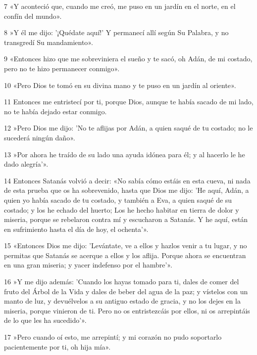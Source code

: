 \par 7 «Y aconteció que, cuando me creó, me puso en un jardín en el norte, en el confín del mundo».

\par 8 »Y él me dijo: '¡Quédate aquí!' Y permanecí allí según Su Palabra, y no transgredí Su mandamiento».

\par 9 «Entonces hizo que me sobreviniera el sueño y te sacó, oh Adán, de mi costado, pero no te hizo permanecer conmigo».

\par 10 «Pero Dios te tomó en su divina mano y te puso en un jardín al oriente».

\par 11 Entonces me entristecí por ti, porque Dios, aunque te había sacado de mi lado, no te había dejado estar conmigo.

\par 12 »Pero Dios me dijo: 'No te aflijas por Adán, a quien saqué de tu costado; no le sucederá ningún daño».

\par 13 »Por ahora he traído de su lado una ayuda idónea para él; y al hacerlo le he dado alegría'».

\par 14 Entonces Satanás volvió a decir: «No sabía cómo estáis en esta cueva, ni nada de esta prueba que os ha sobrevenido, hasta que Dios me dijo: 'He aquí, Adán, a quien yo había sacado de tu costado, y también a Eva, a quien saqué de su costado; y los he echado del huerto; Los he hecho habitar en tierra de dolor y miseria, porque se rebelaron contra mí y escucharon a Satanás. Y he aquí, están en sufrimiento hasta el día de hoy, el ochenta'».

\par 15 «Entonces Dios me dijo: 'Levántate, ve a ellos y hazlos venir a tu lugar, y no permitas que Satanás se acerque a ellos y los aflija. Porque ahora se encuentran en una gran miseria; y yacer indefenso por el hambre'».

\par 16 »Y me dijo además: 'Cuando los hayas tomado para ti, dales de comer del fruto del Árbol de la Vida y dales de beber del agua de la paz; y vístelos con un manto de luz, y devuélvelos a su antiguo estado de gracia, y no los dejes en la miseria, porque vinieron de ti. Pero no os entristezcáis por ellos, ni os arrepintáis de lo que les ha sucedido'».

\par 17 »Pero cuando oí esto, me arrepintí; y mi corazón no pudo soportarlo pacientemente por ti, oh hija mía».

